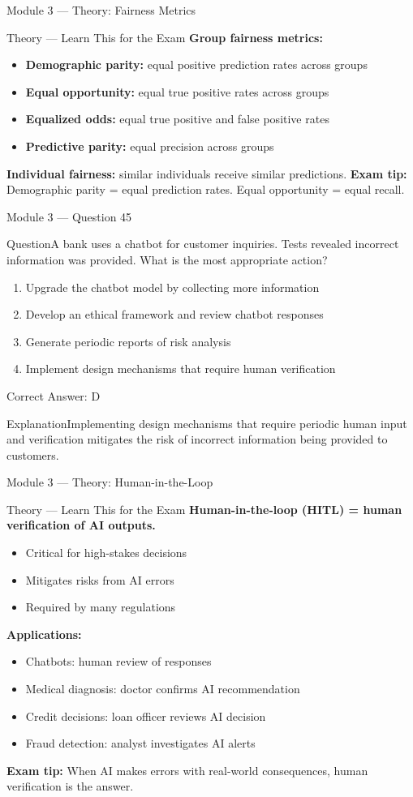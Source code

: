 \documentclass[aspectratio=169,10pt]{beamer}
\newcommand{\question}[1]{\begin{block}{Question}#1\end{block}}
\newcommand{\options}[4]{%
	\begin{enumerate}[label=\Alph*.,leftmargin=*]
		\item #1
		\item #2
		\item #3
		\item #4
	\end{enumerate}
}
\newcommand{\answerbox}[1]{\begin{exampleblock}{Correct Answer: #1}\end{exampleblock}}
\newcommand{\explain}[1]{\begin{block}{Explanation}#1\end{block}}
\newcommand{\theory}[1]{%
	\begin{block}{Theory --- Learn This for the Exam}
		\small #1
	\end{block}
}
\begin{document}
	\begin{frame}{Module 3 --- Theory: Fairness Metrics}
		\theory{
			\textbf{Group fairness metrics:}
			\begin{itemize}
				\item \textbf{Demographic parity:} equal positive prediction rates across groups
				\item \textbf{Equal opportunity:} equal true positive rates across groups
				\item \textbf{Equalized odds:} equal true positive and false positive rates
				\item \textbf{Predictive parity:} equal precision across groups
			\end{itemize}
			\textbf{Individual fairness:} similar individuals receive similar predictions.
			\textbf{Exam tip:} Demographic parity = equal prediction rates. Equal opportunity = equal recall.
		}
	\end{frame}
	
	\begin{frame}{Module 3 --- Question 45}
		\question{A bank uses a chatbot for customer inquiries. Tests revealed incorrect information was provided. What is the most appropriate action?}
		\options{Upgrade the chatbot model by collecting more information}{Develop an ethical framework and review chatbot responses}{Generate periodic reports of risk analysis}{Implement design mechanisms that require human verification}
		\answerbox{D}
		\explain{Implementing design mechanisms that require periodic human input and verification mitigates the risk of incorrect information being provided to customers.}
	\end{frame}
	
	\begin{frame}{Module 3 --- Theory: Human-in-the-Loop}
		\theory{
			\textbf{Human-in-the-loop (HITL) = human verification of AI outputs.}
			\begin{itemize}
				\item Critical for high-stakes decisions
				\item Mitigates risks from AI errors
				\item Required by many regulations
			\end{itemize}
			\textbf{Applications:}
			\begin{itemize}
				\item Chatbots: human review of responses
				\item Medical diagnosis: doctor confirms AI recommendation
				\item Credit decisions: loan officer reviews AI decision
				\item Fraud detection: analyst investigates AI alerts
			\end{itemize}
			\textbf{Exam tip:} When AI makes errors with real-world consequences, human verification is the answer.
		}
	\end{frame}
	
\end{document}
